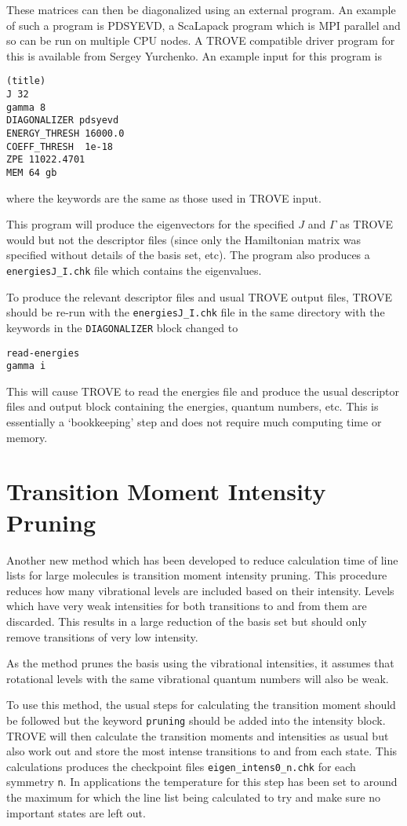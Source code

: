 These matrices can then be diagonalized using an external program. An example of such a program is PDSYEVD, a ScaLapack
program which is MPI parallel and so can be run on multiple CPU nodes. A TROVE compatible driver program for this is 
available from Sergey Yurchenko. An example input for this program is 
\begin{verbatim}
(title)
J 32
gamma 8
DIAGONALIZER pdsyevd
ENERGY_THRESH 16000.0
COEFF_THRESH  1e-18
ZPE 11022.4701
MEM 64 gb
\end{verbatim}
where the keywords are the same as those used in TROVE input.

This program will produce the eigenvectors for the specified $J$ and $\Gamma$ as TROVE would but not the descriptor files
(since only the Hamiltonian matrix was specified without details of the basis set, etc). The program also produces a
\verb|energiesJ_I.chk| file which contains the eigenvalues.

To produce the relevant descriptor files and usual TROVE output files, TROVE should be re-run with the \verb|energiesJ_I.chk|
file in the same directory with the keywords in the \verb|DIAGONALIZER| block changed to
\begin{verbatim}
read-energies
gamma i
\end{verbatim}
This will cause TROVE to read the energies file and produce the usual descriptor files and output block containing the 
energies, quantum numbers, etc. This is essentially a `bookkeeping' step and does not require much computing time or memory.


\section{Transition Moment Intensity Pruning}

Another new method which has been developed to reduce calculation time of line lists for large molecules is transition 
moment intensity pruning. This procedure reduces how many vibrational levels are included based on their intensity. Levels 
which have very weak intensities for both transitions to and from them are discarded. This results in a large reduction of the 
basis set but should only remove transitions of very low intensity. 

As the method prunes the basis using the vibrational intensities, it assumes that rotational levels with the same vibrational
quantum numbers will also be weak. 

To use this method, the usual steps for calculating the transition moment should be followed but the keyword
\verb|pruning| should be added into the intensity block. TROVE will then calculate the transition moments and intensities 
as usual but
also work out and store the most intense transitions to and from each state. This calculations produces the checkpoint files
\verb|eigen_intens0_n.chk| for each symmetry \verb|n|. In applications the temperature for this step has been set to 
around the maximum for which the line list being calculated to try and make sure no important states are left out.

